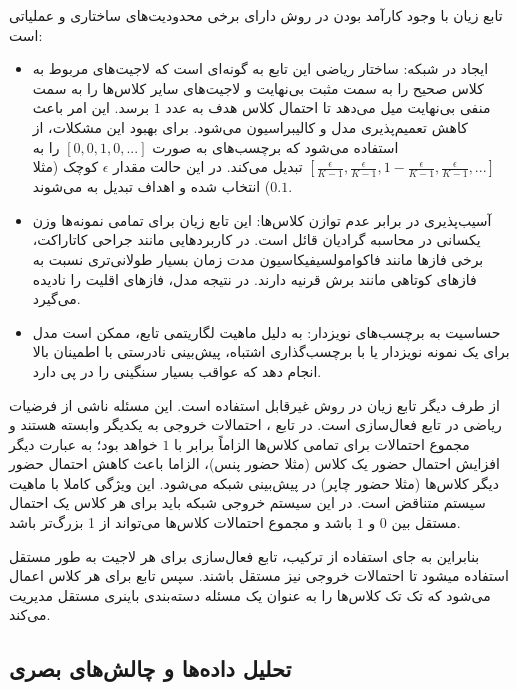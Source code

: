 \documentclass{article}
\begin{document}
تابع زیان  با وجود کارآمد بودن در روش  دارای برخی محدودیت‌های ساختاری و عملیاتی است: 
\begin{itemize}
\item ایجاد  در شبکه:
ساختار ریاضی این تابع به گونه‌ای است که لاجیت‌های مربوط به کلاس صحیح را به سمت مثبت بی‌نهایت و لاجیت‌های سایر کلاس‌ها را به سمت منفی بی‌نهایت میل می‌دهد تا احتمال کلاس هدف به عدد $1$ برسد. این امر باعث کاهش تعمیم‌پذیری مدل و کالیبراسیون می‌شود. برای بهبود این مشکلات، از  استفاده می‌شود که برچسب‌های  به صورت $[0, 0, 1, 0 , ... ]$ را به $[\frac{\epsilon}{K - 1}, \frac{\epsilon}{K - 1}, 1-\frac{\epsilon}{K - 1}, \frac{\epsilon}{K - 1} , ...]$ تبدیل می‌کند. در این حالت مقدار $\epsilon$ کوچک (مثلا $0.1$) انتخاب شده و اهداف تبدیل به  می‌شوند.

\item آسیب‌پذیری در برابر عدم توازن کلاس‌ها:
این تابع زیان برای تمامی نمونه‌ها وزن یکسانی در محاسبه گرادیان قائل است. در کاربردهایی مانند جراحی کاتاراکت، برخی فازها مانند فاکوامولسیفیکاسیون مدت زمان بسیار طولانی‌تری نسبت به فازهای کوتاهی مانند برش قرنیه دارند. در نتیجه مدل، فازهای اقلیت را نادیده می‌گیرد.
\item حساسیت به برچسب‌های نویزدار:
به دلیل ماهیت لگاریتمی تابع، ممکن است مدل برای یک نمونه نویزدار یا با برچسب‌گذاری‌ اشتباه، پیش‌بینی نادرستی با اطمینان بالا انجام دهد که عواقب بسیار سنگینی را در پی دارد.
\end{itemize}

از طرف دیگر تابع زیان  در روش  غیرقابل استفاده است. این مسئله ناشی از فرضیات ریاضی در تابع فعال‌سازی  است.
در تابع ، احتمالات خروجی به یکدیگر وابسته هستند و مجموع احتمالات برای تمامی کلاس‌ها الزاماً برابر با $1$ خواهد بود؛ به عبارت دیگر افزایش احتمال حضور یک کلاس (مثلا حضور پنس)، الزاما باعث کاهش احتمال حضور دیگر کلاس‌ها (مثلا حضور چاپر) در پیش‌بینی شبکه می‌شود. این ویژگی کاملا با ماهیت سیستم  متناقض است. در این سیستم خروجی شبکه باید برای هر کلاس یک احتمال مستقل بین $0$ و $1$ باشد و مجموع احتمالات کلاس‌ها می‌تواند از 1 بزرگ‌تر باشد.

بنابراین به جای استفاده از ترکیب، تابع فعال‌سازی  برای هر لاجیت به طور مستقل استفاده میشود تا احتمالات خروجی نیز مستقل باشند. سپس تابع  برای هر کلاس اعمال می‌شود که تک تک کلاس‌ها را به عنوان یک مسئله دسته‌بندی باینری مستقل مدیریت می‌کند.

\subsection{تحلیل داده‌ها و چالش‌های بصری}
\end{document}
